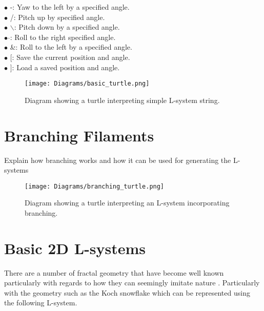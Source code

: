 $\bullet$ -: 				\hspace{10mm} 		Yaw to the left by a specified angle.  \\
$\bullet$ /: 				\hspace{10mm} 		Pitch up by specified angle. \\
$\bullet$ $\backslash$: 	\hspace{10mm} 		Pitch down by a specified angle.  \\
$\bullet$ $\hat{}$: 		\hspace{10mm} 		Roll to the right specified angle. \\
$\bullet$ \&:				\hspace{10mm}  		Roll to the left by a specified angle.  \\
$\bullet$ $[$: 				\hspace{10mm} 		Save the current position and angle. \\
$\bullet$ $]$: 				\hspace{10mm}		Load a saved position and angle. \\

\begin{figure}[htbp]
	{\centering
		\vspace{7px}
		\texttt{[image: Diagrams/basic\_turtle.png]}
		\caption{Diagram showing a turtle interpreting simple L-system string.}
	}
\end{figure}
\FloatBarrier

\section{Branching Filaments}

Explain how branching works and how it can be used for generating the L-systems

\begin{figure}[htbp]
	{\centering
		\vspace{7px}
		\texttt{[image: Diagrams/branching\_turtle.png]}
		\caption{Diagram showing a turtle interpreting an L-system incorporating branching.}
	}
\end{figure}
\FloatBarrier


\section{Basic 2D L-systems} 

There are a number of fractal geometry that have become well known particularly with regards to how they can seemingly imitate nature \cite{mandelbrot1982fractal}. Particularly with the geometry such as the Koch snowflake which can be represented using the following L-system.

